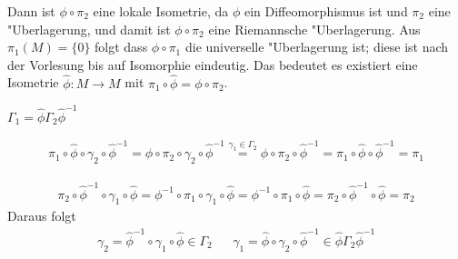 \begin{Loes}
\begin{description}[leftmargin=*]
{}
	Dann ist $\phi \circ \pi_2$ eine lokale Isometrie, da $\phi$ ein Diffeomorphismus ist und $\pi_2$ eine "Uberlagerung, und damit ist $\phi \circ \pi_2$ eine Riemannsche "Uberlagerung.
	Aus $\pi_1(M) = \{0\}$ folgt dass $\phi \circ \pi_1$ die universelle "Uberlagerung ist; diese ist nach der Vorlesung bis auf Isomorphie eindeutig.
	Das bedeutet es existiert eine Isometrie $\hat\phi: M \to M$ mit $\pi_1 \circ \hat\phi = \phi \circ \pi_2$.
	\begin{description}[leftmargin=*,font=\normalfont\itshape]
	\item[Behauptung:] $\Gamma_1 = \hat\phi \Gamma_2 \hat\phi^{-1}$
	\item[Beweis:] \begin{description}[leftmargin=*,font=\normalfont]
		\item[\quot{$\subseteq$}:]
			\begin{align*}
				\pi_1 \circ \hat\phi \circ \gamma_2 \circ \hat\phi^{-1} = \phi \circ \pi_2 \circ \gamma_2 \circ \hat\phi^{-1} \overset{\gamma_1 \in \Gamma_2}{=} \phi \circ \pi_2 \circ \hat\phi^{-1} = \pi_1 \circ \hat\phi \circ \hat\phi^{-1} = \pi_1
			\end{align*}
		\item[\quot{$\supseteq$}:]
			\begin{align*}
				\pi_2 \circ \hat\phi^{-1} \circ \gamma_1 \circ \hat\phi = \phi^{-1} \circ \pi_1 \circ \gamma_1 \circ \hat\phi = \phi^{-1} \circ \pi_1 \circ \hat\phi = \pi_2 \circ \hat\phi^{-1} \circ \hat\phi = \pi_2
			\end{align*}
			Daraus folgt
			\begin{align*}
				\gamma_2 = \hat\phi^{-1} \circ \gamma_1 \circ \hat\phi \in \Gamma_2 && \gamma_1 = \hat\phi \circ \gamma_2 \circ \hat\phi^{-1} \in \hat\phi \Gamma_2 \hat\phi^{-1}
			\end{align*}
		\end{description}
	\end{description}
\end{description}\end{Loes}